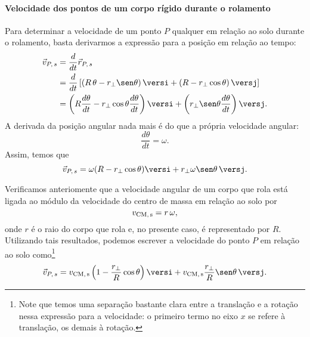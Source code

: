\paragraph{Velocidade dos pontos de um corpo rígido durante o rolamento}

Para determinar a velocidade de um ponto $P$ qualquer em relação ao solo durante o rolamento, basta derivarmos a expressão para a posição em relação ao tempo:
\begin{align}
    \vec{v}_{P, \, s} &= \frac{d}{dt}\vec{r}_{P, \, s} \\
    &= \frac{d}{dt}\left[(R\,\theta - r_\perp \sen\theta)\,\versi + (R - r_\perp \cos\theta)\,\versj\right] \\
    &= \left(R \frac{d\theta}{dt} - r_\perp \cos\theta\frac{d\theta}{dt}\right)\versi + \left(r_\perp \sen\theta\frac{d\theta}{dt}\right)\versj.
\end{align}
%
A derivada da posição angular nada mais é do que a própria velocidade angular:
\begin{equation}
    \frac{d\theta}{dt} = \omega.
\end{equation}
Assim, temos que
\begin{equation}\label{Eq:VelPSoloOmega}
    \vec{v}_{P, \, s} = \omega(R - r_\perp \cos\theta)\versi + r_\perp \omega \sen\theta \,\versj.
\end{equation}

Verificamos anteriomente que a velocidade angular de um corpo que rola está ligada ao módulo da velocidade do centro de massa em relação ao solo por
\begin{equation}
    v_{\rm{CM},\, s} = r\,\omega,
\end{equation}
%
onde $r$ é o raio do corpo que rola e, no presente caso, é representado por $R$. Utilizando tais resultados, podemos escrever a velocidade do ponto $P$ em relação ao solo como\footnote{Note que temos uma separação bastante clara entre a translação e a rotação nessa expressão para a velocidade: o primeiro termo no eixo $x$ se refere à translação, os demais à rotação.}
\begin{equation}\label{Eq:VelPSoloVCM}
    \vec{v}_{P, \, s} = v_{\rm{CM}, \, s}\left(1 - \frac{r_\perp}{R} \cos\theta\right)\versi + v_{\rm{CM},\, s} \frac{r_\perp}{R} \sen\theta \,\versj.
\end{equation}


